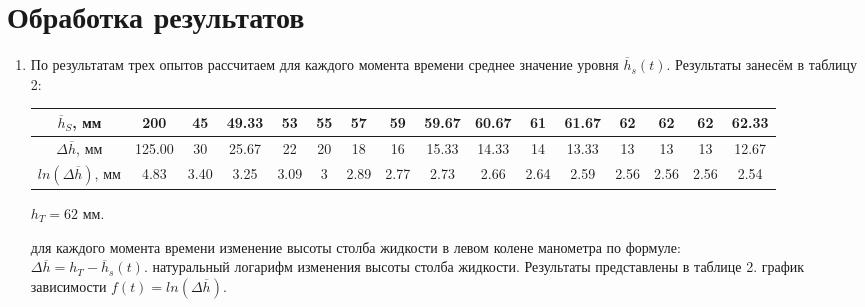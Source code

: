 \documentclass[12pt]{article}
\begin{document}
\section*{Обработка результатов}
\begin{enumerate}
\item По результатам трех опытов рассчитаем для каждого момента времени среднее значение уровня $\overline{h}_{s}(t)$. Результаты занесём в таблицу 2:
\begin{table}[h!]
\begin{center}
\footnotesize

\begin{tabular}{|c|c|c|c|c|c|c|c|c|c|c|c|c|c|c|c|}
\hline
$\overline{h}_{S}$, мм&200&45&49.33&53&55&57&59&59.67&60.67&61&61.67&62&62&62&62.33\\
\hline
$\Delta \overline{h}$, мм&125.00&
30&
25.67&
22&
20&
18&
16&
15.33&
14.33&
14&
13.33&
13&
13&
13&
12.67
\\
\hline
$ln(\Delta \overline{h})$, мм&4.83&
3.40&
3.25&
3.09&
3&
2.89&
2.77&
2.73&
2.66&
2.64&
2.59&
2.56&
2.56&
2.56&
2.54
\\
\hline

\end{tabular}

$h_{T}=62$ мм.
\end{center}
\end{table} 
 для каждого момента времени изменение высоты столба жидкости в левом колене манометра по формуле:\\
$\Delta \overline{h} = h_{T} - \overline{h}_{s}(t)$.
 натуральный логарифм изменения высоты столба жидкости. Результаты представлены в таблице 2.
\newpage	
{} график зависимости $f(t) = ln(\Delta \overline{h})$.
					     

\end{enumerate}
\end{document}
